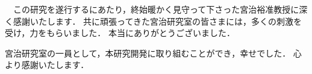 　この研究を遂行するにあたり，終始暖かく見守って下さった宮治裕准教授に深く感謝いたします．
共に頑張ってきた宮治研究室の皆さまには，多くの刺激を受け，力をもらいました．
本当にありがとうございました．

宮治研究室の一員として，本研究開発に取り組むことができ，幸せでした．
心より感謝いたします．
